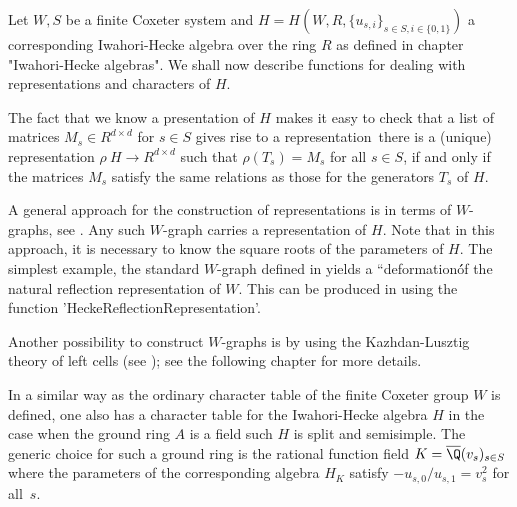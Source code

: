 

Let  $W,S$ be a  finite Coxeter system  and $H =  H(W, R, \{u_{s,i}\}_{s\in
S,i\in\{0,1\}})$ a corresponding Iwahori-Hecke algebra over the ring $R$ as
defined   in  chapter  "Iwahori-Hecke  algebras".  We  shall  now  describe
functions for dealing with representations and characters of $H$.

The  fact that we know a presentation of  $H$ makes it easy to check that a
list  of matrices  $M_s \in  R^{d \times  d}$ for  $s\in S$ gives rise to a
representation\:\  there is a  (unique) representation $\rho\:H \rightarrow
R^{d  \times d}$ such that $\rho(T_s)=M_s$ for all $s\in S$, if and only if
the  matrices $M_s$ satisfy the same  relations as those for the generators
$T_s$ of $H$.

A  general approach for the construction  of representations is in terms of
$W$-graphs,   see   \cite[p.165]{KL79}.   Any   such  $W$-graph  carries  a
representation  of $H$. Note that in this approach, it is necessary to know
the  square  roots  of  the  parameters  of  $H$. The simplest example, the
standard $W$-graph defined in \cite[Ex.~6.2]{KL79} yields a
``deformation\'\' of the natural reflection representation of $W$. This can
be produced in {\CHEVIE} using the function
'HeckeReflectionRepresentation'.

Another  possibility   to  construct    $W$-graphs   is by   using    the
Kazhdan-Lusztig theory of left cells (see \cite{KL79}); see the following
chapter for more details.

In  a similar  way as  the ordinary  character table  of the finite Coxeter
group  $W$ is defined, one also has a character table for the Iwahori-Hecke
algebra  $H$ in the  case when the  ground ring $A$  is a field such $H$ is
split  and semisimple.  The generic  choice for  such a  ground ring is the
rational   function   field   $K=\overline{\Q}(v_s)_{s\in   S}$  where  the
parameters of the corresponding algebra $H_K$ satisfy
$-u_{s,0}/u_{s,1}=v_s^2$ for all~$s$.

